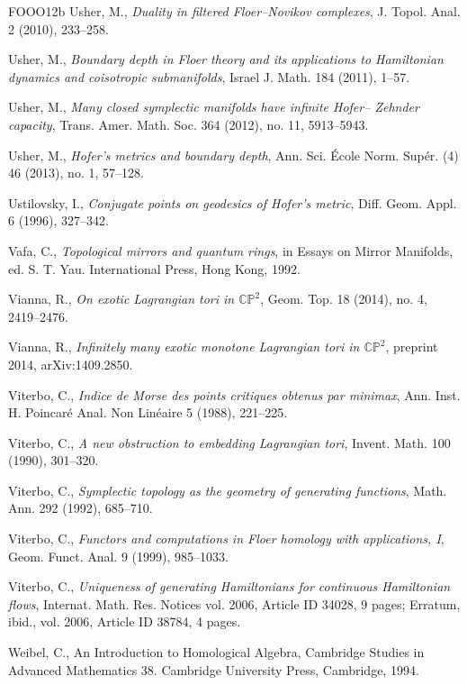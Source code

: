 \begin{thebibliography}{FOOO12b}
 Usher, M., \emph{Duality in filtered Floer–Novikov complexes}, J. Topol. Anal. 2
  (2010), 233–258.

 Usher, M., \emph{Boundary depth in Floer theory and its applications to
  Hamiltonian dynamics and coisotropic submanifolds}, Israel J. Math. 184 (2011), 1–57.

 Usher, M., \emph{Many closed symplectic manifolds have infinite Hofer– Zehnder
  capacity}, Trans. Amer. Math. Soc. 364 (2012), no. 11, 5913–5943.

 Usher, M., \emph{Hofer’s metrics and boundary depth}, Ann. Sci. École Norm. Supér.
  (4) 46 (2013), no. 1, 57–128.

 Ustilovsky, I., \emph{Conjugate points on geodesics of Hofer’s metric}, Diﬀ. Geom.
  Appl. 6 (1996), 327–342.

 Vafa, C., \emph{Topological mirrors and quantum rings}, in Essays on Mirror
  Manifolds, ed. S. T. Yau. International Press, Hong Kong, 1992.

 Vianna, R., \emph{On exotic Lagrangian tori in $\mathbb{CP}^2$}, Geom. Top. 18
  (2014), no. 4, 2419–2476.

 Vianna, R., \emph{Infinitely many exotic monotone Lagrangian tori in
  $\mathbb{CP}^2$}, preprint 2014, arXiv:1409.2850.

 Viterbo, C., \emph{Indice de Morse des points critiques obtenus par minimax}, Ann.
  Inst. H. Poincaré Anal. Non Linéaire 5 (1988), 221–225.

 Viterbo, C., \emph{A new obstruction to embedding Lagrangian tori}, Invent. Math.
  100 (1990), 301–320.

 Viterbo, C., \emph{Symplectic topology as the geometry of generating functions},
  Math. Ann. 292 (1992), 685–710.

 Viterbo, C., \emph{Functors and computations in Floer homology with applica\-tions,
  I}, Geom. Funct. Anal. 9 (1999), 985–1033.

 Viterbo, C., \emph{Uniqueness of generating Hamiltonians for continuous Hamiltonian
  flows}, Internat. Math. Res. Notices vol. 2006, Article ID 34028, 9 pages; Erratum, ibid., vol. 2006,
  Article ID 38784, 4 pages.

 Weibel, C., An Introduction to Homological Algebra, Cambridge Studies in Advanced
  Mathematics 38. Cambridge University Press, Cambridge, 1994.


\end{thebibliography}
